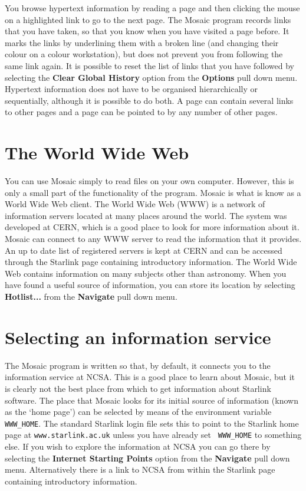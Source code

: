You browse hypertext information by reading a page and then clicking the mouse
on a highlighted link to go to the next page. The Mosaic program records links
that you have taken, so that you know when you have visited a page before. It
marks the links by underlining them with a broken line (and changing their
colour on a colour workstation), but does not prevent you from following the
same link again. It is possible to reset the list of links that you have
followed by selecting the {\bf Clear Global History} option from the {\bf
Options} pull down menu. Hypertext information does not have to be organised
hierarchically or sequentially, although it is possible to do both. A page can
contain several links to other pages and a page can be pointed to by any number
of other pages. 


\section{The World Wide Web}

You can use Mosaic simply to read files on your own computer. However, this is
only a small part of the functionality of the program. Mosaic is what is know
as a World Wide Web client. The World Wide Web (WWW) is a network of
information servers located at many places around the world. The system was
developed at CERN, which is a good place to look for more information about it.
Mosaic can connect to any WWW server to read the information that it provides.
An up to date list of registered servers is kept at CERN and can be accessed
through the Starlink page containing introductory information. The World Wide
Web contains information on many subjects other than astronomy. When you have
found a useful source of information, you can store its location by selecting
{\bf Hotlist...} from the {\bf Navigate} pull down menu. 

\section{Selecting an information service}
\label{service}

The Mosaic program is written so that, by default, it connects you to the
information service at NCSA. This is a good place to learn about Mosaic, but it
is clearly not the best place from which to get information about Starlink
software. The place that Mosaic looks for its initial source of information
(known as the `home page') can be selected by means of the environment variable
{\tt WWW\_HOME}. The standard Starlink login file sets this to point to the
Starlink home page at {\tt www.starlink.ac.uk} unless you have already set {\tt
WWW\_HOME} to something else. If you wish to explore the information at NCSA
you can go there by selecting the {\bf Internet Starting Points} option from
the {\bf Navigate} pull down menu. Alternatively there is a link to NCSA from
within the Starlink page containing introductory information. 

